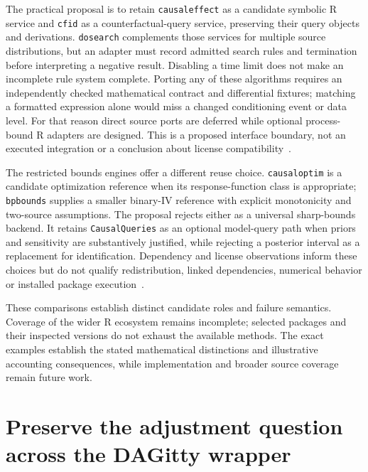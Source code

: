 The practical proposal is to retain \texttt{causaleffect} as a candidate symbolic R service and \texttt{cfid} as a counterfactual-query service, preserving their query objects and derivations. \texttt{dosearch} complements those services for multiple source distributions, but an adapter must record admitted search rules and termination before interpreting a negative result. Disabling a time limit does not make an incomplete rule system complete. Porting any of these algorithms requires an independently checked mathematical contract and differential fixtures; matching a formatted expression alone would miss a changed conditioning event or data level. For that reason direct source ports are deferred while optional process-bound R adapters are designed. This is a proposed interface boundary, not an executed integration or a conclusion about license compatibility~\citep{exec18_rid_causaleffect,exec18_rid_cfid,exec18_rid_dosearch}.

The restricted bounds engines offer a different reuse choice. \texttt{causaloptim} is a candidate optimization reference when its response-function class is appropriate; \texttt{bpbounds} supplies a smaller binary-IV reference with explicit monotonicity and two-source assumptions. The proposal rejects either as a universal sharp-bounds backend. It retains \texttt{CausalQueries} as an optional model-query path when priors and sensitivity are substantively justified, while rejecting a posterior interval as a replacement for identification. Dependency and license observations inform these choices but do not qualify redistribution, linked dependencies, numerical behavior or installed package execution~\citep{exec18_rid_causaloptim,exec18_rid_bpbounds,exec18_rid_causalqueries}.

These comparisons establish distinct candidate roles and failure semantics. Coverage of the wider R ecosystem remains incomplete; selected packages and their inspected versions do not exhaust the available methods. The exact examples establish the stated mathematical distinctions and illustrative accounting consequences, while implementation and broader source coverage remain future work.


\section{Preserve the adjustment question across the DAGitty wrapper}
\label{exec18:gp-graph}

